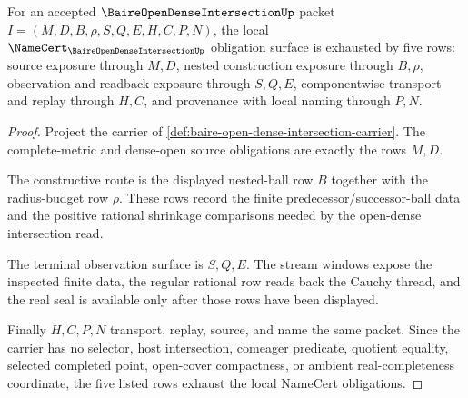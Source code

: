 \begin{theorem}
\label{thm:baire-open-dense-intersection-obligations}
For an accepted $\BaireOpenDenseIntersectionUp$ packet $I=(M,D,B,\rho,S,Q,E,H,C,P,N)$, the local $\NameCert_{\BaireOpenDenseIntersectionUp}$ obligation surface is exhausted by five rows: source exposure through $M,D$, nested construction exposure through $B,\rho$, observation and readback exposure through $S,Q,E$, componentwise transport and replay through $H,C$, and provenance with local naming through $P,N$.
\end{theorem}
\begin{proof}
Project the carrier of \autoref{def:baire-open-dense-intersection-carrier}. The complete-metric and dense-open source obligations are exactly the rows $M,D$.

The constructive route is the displayed nested-ball row $B$ together with the radius-budget row $\rho$. These rows record the finite predecessor/successor-ball data and the positive rational shrinkage comparisons needed by the open-dense intersection read.

The terminal observation surface is $S,Q,E$. The stream windows expose the inspected finite data, the regular rational row reads back the Cauchy thread, and the real seal is available only after those rows have been displayed.

Finally $H,C,P,N$ transport, replay, source, and name the same packet. Since the carrier has no selector, host intersection, comeager predicate, quotient equality, selected completed point, open-cover compactness, or ambient real-completeness coordinate, the five listed rows exhaust the local NameCert obligations.
\end{proof}

